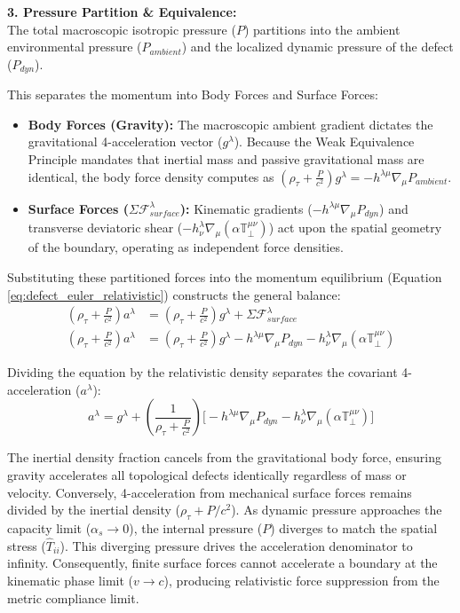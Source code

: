 \textbf{3. Pressure Partition \& Equivalence:} \\
The total macroscopic isotropic pressure ($P$) partitions into the ambient environmental pressure ($P_{ambient}$) and the localized dynamic pressure of the defect ($P_{dyn}$).

This separates the momentum into Body Forces and Surface Forces:
\begin{itemize}[nosep]
    \item \textbf{Body Forces (Gravity):} The macroscopic ambient gradient dictates the gravitational 4-acceleration vector ($g^\lambda$). Because the Weak Equivalence Principle mandates that inertial mass and passive gravitational mass are identical, the body force density computes as $\left(\rho_\tau + \frac{P}{c^2}\right) g^\lambda = -h^{\lambda\mu} \nabla_\mu P_{ambient}$.
    \item \textbf{Surface Forces ($\Sigma \mathcal{F}_{surface}^\lambda$):} Kinematic gradients ($-h^{\lambda\mu} \nabla_\mu P_{dyn}$) and transverse deviatoric shear ($-h^\lambda_\nu \nabla_\mu (\alpha \mathbb{T}_{\perp}^{\mu\nu})$) act upon the spatial geometry of the boundary, operating as independent force densities.
\end{itemize}

Substituting these partitioned forces into the momentum equilibrium (Equation \ref{eq:defect_euler_relativistic}) constructs the general balance:
\begin{align}
    \left(\rho_\tau + \frac{P}{c^2}\right) a^\lambda &= \left(\rho_\tau + \frac{P}{c^2}\right) g^\lambda + \Sigma \mathcal{F}_{surface}^\lambda \nonumber \\
    \left(\rho_\tau + \frac{P}{c^2}\right) a^\lambda &= \left(\rho_\tau + \frac{P}{c^2}\right) g^\lambda - h^{\lambda\mu} \nabla_\mu P_{dyn} - h^\lambda_\nu \nabla_\mu (\alpha \mathbb{T}_{\perp}^{\mu\nu})
\end{align}

Dividing the equation by the relativistic density separates the covariant 4-acceleration ($a^\lambda$):
\begin{equation}
    a^\lambda = g^\lambda + \left( \frac{1}{\rho_\tau + \frac{P}{c^2}} \right) \Big[ -h^{\lambda\mu} \nabla_\mu P_{dyn} - h^\lambda_\nu \nabla_\mu (\alpha \mathbb{T}_{\perp}^{\mu\nu}) \Big] \label{eq:relativistic_compliance_modified_ns}
\end{equation}

The inertial density fraction cancels from the gravitational body force, ensuring gravity accelerates all topological defects identically regardless of mass or velocity. Conversely, 4-acceleration from mechanical surface forces remains divided by the inertial density ($\rho_\tau + P/c^2$). As dynamic pressure approaches the capacity limit ($\alpha_s \to 0$), the internal pressure ($P$) diverges to match the spatial stress ($\hat{T}_{ii}$). This diverging pressure drives the acceleration denominator to infinity. Consequently, finite surface forces cannot accelerate a boundary at the kinematic phase limit ($v \to c$), producing relativistic force suppression from the metric compliance limit.

